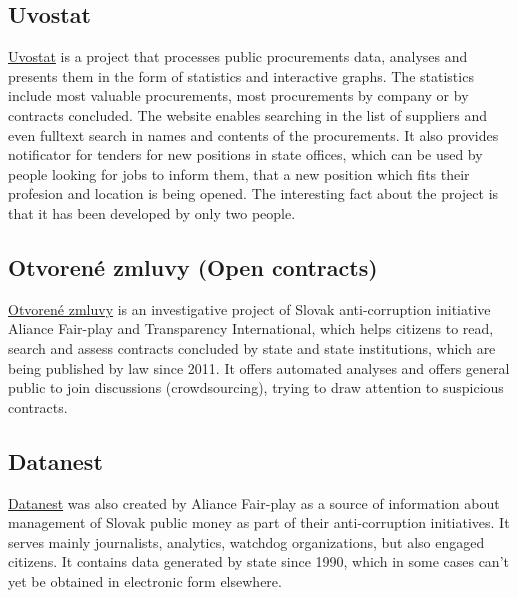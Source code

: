 \documentclass[thesis=B,english]{FITthesis}[2012/06/26]
\begin{document}
	\subsection{Uvostat}
	\href{https://www.uvostat.sk/about}{Uvostat} is a project that processes public procurements data, analyses and presents them in the form of statistics and interactive graphs. The statistics include most valuable procurements, most procurements by company or by contracts concluded. The website enables searching in the list of suppliers and even fulltext search in names and contents of the procurements. It also provides notificator for tenders for new positions in state offices, which can be used by people looking for jobs to inform them, that a new position which fits their profesion and location is being opened. The interesting fact about the project is that it has been developed by only two people.
	\subsection{Otvorené zmluvy (Open contracts)}
	\href{http://www.otvorenezmluvy.sk/o-projekte}{Otvorené zmluvy} is an investigative project of Slovak anti-corruption initiative Aliance Fair-play and Transparency International, which helps citizens to read, search and assess contracts concluded by state and state institutions, which are being published by law since 2011. It offers automated analyses and offers general public to join discussions (crowdsourcing), trying to draw attention to suspicious contracts.	
	\subsection{Datanest}
	\href{http://datanest.fair-play.sk/}{Datanest} was also created by Aliance Fair-play as a source of information about management of Slovak public money as part of their anti-corruption initiatives. It serves mainly journalists, analytics, watchdog organizations, but also engaged citizens. It contains data generated by state since 1990, which in some cases can't yet be obtained in electronic form elsewhere.
\end{document}

